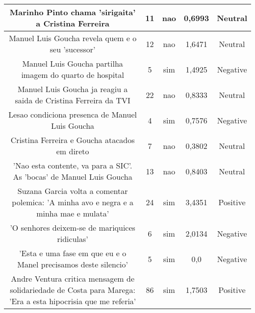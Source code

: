 \documentclass[11pt]{article}
\newlength\mylength
\begin{document}
\begin{center}
\begin{longtable}{||C{.40\mylength}||C{.20\mylength}||C{.20\mylength}||C{.30\mylength}||C{.20\mylength}||}
   Marinho Pinto chama 'sirigaita' a Cristina Ferreira  & 11 & nao & 0,6993 & Neutral \\  \hline
   Manuel Luis Goucha revela quem e o seu 'sucessor'  & 12 & nao & 1,6471 & Neutral \\  \hline
   Manuel Luis Goucha partilha imagem do quarto de hospital  & 5 & sim & 1,4925 & Negative \\  \hline
   Manuel Luis Goucha ja reagiu a saida de Cristina Ferreira da TVI  & 22 & nao & 0,8333 & Neutral \\  \hline
   Lesao condiciona presenca de Manuel Luis Goucha  & 4 & sim & 0,7576 & Negative \\  \hline
   Cristina Ferreira e Goucha atacados em direto  & 7 & nao & 0,3802 & Neutral \\  \hline
   'Nao esta contente, va para a SIC'. As 'bocas' de Manuel Luis Goucha  & 13 & nao & 0,8403 & Neutral \\  \hline
   Suzana Garcia volta a comentar polemica: 'A minha avo e negra e a minha mae e mulata'  & 24 & sim & 3,4351 & Positive \\  \hline
   'O senhores deixem-se de mariquices ridiculas'  & 6 & sim & 2,0134 & Negative \\  \hline
   'Esta e uma fase em que eu e o Manel precisamos deste silencio'  & 5 & sim & 0,0 & Negative \\  \hline
   Andre Ventura critica mensagem de solidariedade de Costa para Marega: 'Era a esta hipocrisia que me referia'  & 86 & sim & 1,7503 & Positive \\  \hline

\end{longtable}
\end{center}
\end{document}
